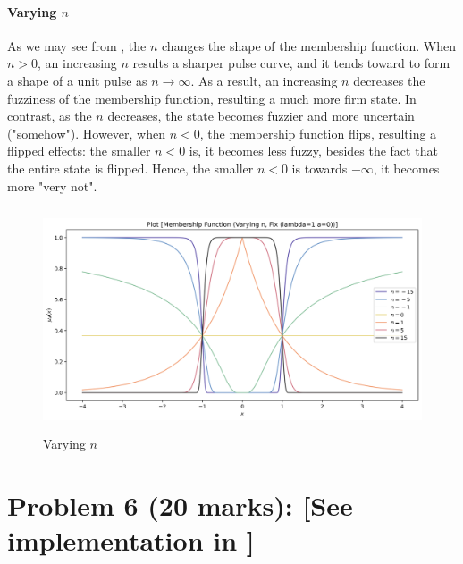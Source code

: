 \documentclass{tron}
\begin{document}
\paragraph{Varying $n$}
As we may see from , the $n$ changes the shape of the membership function. When $n > 0$, an increasing $n$ results a sharper pulse curve, and it tends toward to form a shape of a unit pulse as $n\rightarrow \infty$. As a result, an increasing $n$ decreases the fuzziness of the membership function, resulting a much more firm state. In contrast, as the $n$ decreases, the state becomes fuzzier and more uncertain ("somehow"). However, when $n < 0$, the membership function flips, resulting a flipped effects: the smaller $n<0$ is, it becomes less fuzzy, besides the fact that the entire state is flipped. Hence, the smaller $n<0$ is towards $-\infty$, it becomes more "very not".
\begin{figure}[H]
	\centering
	\includegraphics[height=250px]{../src_code/output/P5/plot_Membership Function (Varying n, Fix (lambda=1 a=0))}
	\caption{Varying $n$}
	\label{fig:p5:n}
\end{figure}



\clearpage
\section{Problem 6 (20 marks): [See implementation in ]}
\end{document}
